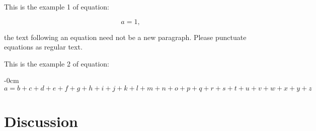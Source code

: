 \documentclass[journal,article,submit,pdftex,moreauthors]{Definitions/mdpi}
\begin{document}
This is the example 1 of equation:
\begin{linenomath}
\begin{equation}
a = 1,
\end{equation}
\end{linenomath}
the text following an equation need not be a new paragraph. Please punctuate equations as regular text.

This is the example 2 of equation:
\begin{adjustwidth}{-\extralength}{0cm}
\begin{equation}
a = b + c + d + e + f + g + h + i + j + k + l + m + n + o + p + q + r + s + t + u + v + w + x + y + z
\end{equation}
\end{adjustwidth}







\section{Discussion}
\end{document}
